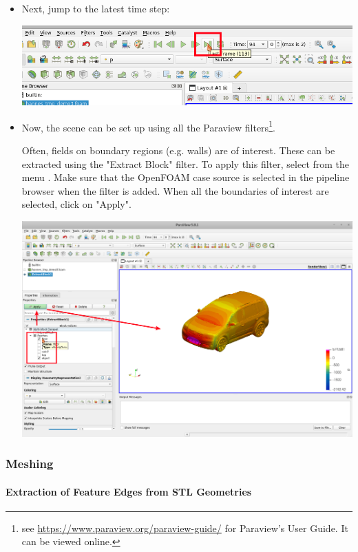 \begin{itemize}
\item
Next, jump to the latest time step:

\includegraphics[width=0.75\linewidth]{figs/paraview_of/jump_to_latest_timestep}

\item Now, the scene can be set up using all the Paraview filters\footnote{see \url{https://www.paraview.org/paraview-guide/} for Paraview's User Guide. It can be viewed online.}.

Often, fields on boundary regions (e.g. walls) are of interest.
These can be extracted using the "Extract Block" filter.
To apply this filter, select from the menu .
Make sure that the OpenFOAM case source is selected in the pipeline browser when the filter is added.
When all the boundaries of interest are selected, click on "Apply".

\includegraphics[width=0.75\linewidth]{figs/paraview_of/paraview_extract_block}

\end{itemize}



\subsubsection{Meshing}



\paragraph{Extraction of Feature Edges from STL Geometries}

